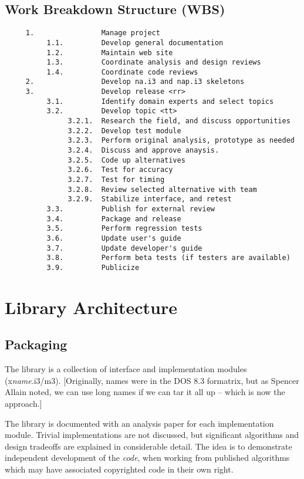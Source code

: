 \subsection{Work Breakdown Structure (WBS)}
\begin{verbatim}
     1.                Manage project
          1.1.         Develop general documentation
          1.2.         Maintain web site
          1.3.         Coordinate analysis and design reviews
          1.4.         Coordinate code reviews
     2.                Develop na.i3 and nap.i3 skeletons
     3.                Develop release <rr>
          3.1.         Identify domain experts and select topics
          3.2.         Develop topic <tt>
               3.2.1.  Research the field, and discuss opportunities
               3.2.2.  Develop test module
               3.2.3.  Perform original analysis, prototype as needed
               3.2.4.  Discuss and approve anaysis.
               3.2.5.  Code up alternatives
               3.2.6.  Test for accuracy
               3.2.7.  Test for timing
               3.2.8.  Review selected alternative with team
               3.2.9.  Stabilize interface, and retest
          3.3.         Publish for external review
          3.4.         Package and release
          3.5.         Perform regression tests
          3.6.         Update user's guide
          3.7.         Update developer's guide
          3.8.         Perform beta tests (if testers are available)
          3.9.         Publicize
\end{verbatim}

\section{Library Architecture}
\subsection{Packaging}
The library is a collection of interface and implementation
modules (x{\it name}.i3/m3).  [Originally, names were in the DOS 8.3
formatrix, but as Spencer Allain noted, we can use long names
if we can tar it all up -- which is now the approach.]

The library is documented with an analysis paper for each
implementation module.  Trivial implementations are not
discussed, but significant algorithms and design tradeoffs
are explained in considerable detail.  The idea is to
demonstrate independent development of the {\em code}, when
working from published algorithms which may have associated
copyrighted code in their own right.

